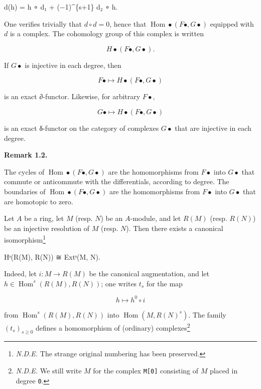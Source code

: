 \documentclass[
  11pt,
  a4paper,
]{book}
\newenvironment{Shaded}{}{}
\newcommand{\NormalTok}[1]{#1}
\begin{document}
\begin{Shaded}
\begin{Highlighting}[]
\NormalTok{d(h) = h ∘ d₁ + (−1)\^{}\{s+1\} d₂ ∘ h.}
\end{Highlighting}
\end{Shaded}

One verifies trivially that \(d \circ d = 0\), hence that
\(\operatorname{Hom}\bullet(F\bullet, G\bullet)\) equipped with \(d\) is
a complex. The cohomology group of this complex is written

\[ H\bullet(F\bullet, G\bullet). \]

If \(G\bullet\) is injective in each degree, then

\[ F\bullet \mapsto H\bullet(F\bullet, G\bullet) \]

is an exact ∂-functor. Likewise, for arbitrary \(F\bullet\),

\[ G\bullet \mapsto H\bullet(F\bullet, G\bullet) \]

is an exact δ-functor on the category of complexes \(G\bullet\) that are
injective in each degree.

\textbf{Remark 1.2.}

The cycles of \(\operatorname{Hom}\bullet(F\bullet, G\bullet)\) are the
homomorphisms from \(F\bullet\) into \(G\bullet\) that commute or
anticommute with the differentials, according to degree. The boundaries
of \(\operatorname{Hom}\bullet(F\bullet, G\bullet)\) are the
homomorphisms from \(F\bullet\) into \(G\bullet\) that are homotopic to
zero.

Let \(A\) be a ring, let \(M\) (resp. \(N\)) be an \(A\)-module, and let
\(R(M)\) (resp. \(R(N)\)) be an injective resolution of \(M\) (resp.
\(N\)). Then there exists a canonical isomorphism\footnote{\emph{N.D.E.}
  The strange original numbering has been preserved.}

\begin{Shaded}
\begin{Highlighting}[]
\NormalTok{Hˢ(R(M), R(N)) ≅ Extˢ(M, N).}
\end{Highlighting}
\end{Shaded}

Indeed, let \(i: M \to R(M)\) be the canonical augmentation, and let
\(h \in \operatorname{Hom}^{s}(R(M), R(N))\); one writes \(t_{s}\) for
the map

\[ h \mapsto h^{0} \circ i \]

from \(\operatorname{Hom}^{s}(R(M), R(N))\) into
\(\operatorname{Hom}(M, R(N)^{s})\). The family
\((t_{s})_{s\geqslant 0}\) defines a homomorphism of (ordinary)
complexes\footnote{\emph{N.D.E.} We still write \(M\) for the complex
  \texttt{M{[}0{]}} consisting of \(M\) placed in degree \texttt{0}.}
\end{document}
